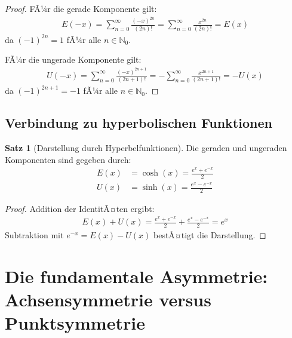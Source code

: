 ﻿\documentclass[a4paper,12pt]{article}
\theoremstyle{definition}
\newtheorem{satz}{Satz}
\begin{document}
\begin{proof}
FÃ¼r die gerade Komponente gilt:
\begin{align}
  E(-x) = \sum_{n=0}^{\infty} \frac{(-x)^{2n}}{(2n)!}
        = \sum_{n=0}^{\infty} \frac{x^{2n}}{(2n)!} = E(x)
\end{align}
da $(-1)^{2n} = 1$ fÃ¼r alle $n \in \mathbb{N}_0$.

FÃ¼r die ungerade Komponente gilt:
\begin{align}
  U(-x) = \sum_{n=0}^{\infty} \frac{(-x)^{2n+1}}{(2n+1)!}
        = -\sum_{n=0}^{\infty} \frac{x^{2n+1}}{(2n+1)!} = -U(x)
\end{align}
da $(-1)^{2n+1} = -1$ fÃ¼r alle $n \in \mathbb{N}_0$.
\end{proof}

\subsection{Verbindung zu hyperbolischen Funktionen}

\begin{satz}[Darstellung durch Hyperbelfunktionen]
Die geraden und ungeraden Komponenten sind gegeben durch:
\begin{align}
  E(x) &= \cosh(x) = \frac{e^x + e^{-x}}{2} \\
  U(x) &= \sinh(x) = \frac{e^x - e^{-x}}{2}
\end{align}
\end{satz}

\begin{proof}
Addition der IdentitÃ¤ten ergibt:
\begin{align}
  E(x) + U(x)
    = \frac{e^x + e^{-x}}{2} + \frac{e^x - e^{-x}}{2} = e^x
\end{align}
Subtraktion mit $e^{-x} = E(x) - U(x)$ bestÃ¤tigt die Darstellung.
\end{proof}

\section{Die fundamentale Asymmetrie: Achsensymmetrie versus Punktsymmetrie}
\end{document}
